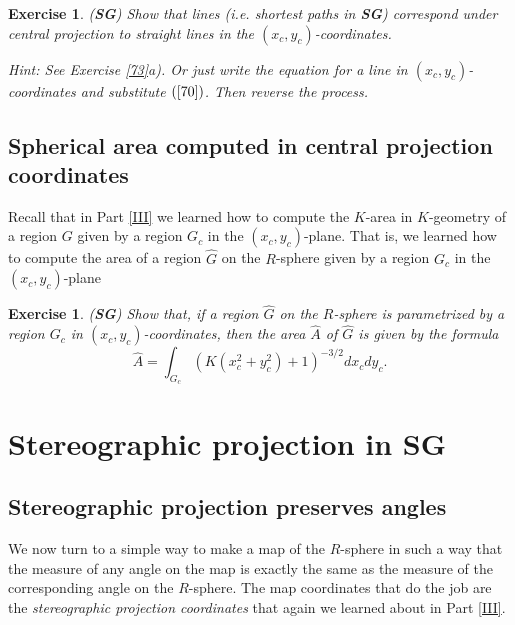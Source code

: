 \documentclass{article}%
\newtheorem{exercise}[theorem]{Exercise}
\begin{document}
\begin{exercise}
(\textbf{SG}) Show that lines (i.e. shortest paths in \textbf{SG}) correspond
under central projection to straight lines in the $\left(  x_{c},y_{c}\right)
$-coordinates.

Hint: See Exercise \ref{73}a). Or just write the equation for a line in
$\left(  x_{c},y_{c}\right)  $-coordinates and substitute $\left(
\ref{70}\right)  $. Then reverse the process.\pagebreak
\end{exercise}

\subsection{Spherical area computed in central projection coordinates}

Recall that in Part \ref{III} we learned how to compute the $K$-area in
$K$-geometry of a region $G$ given by a region $G_{c}$ in the $\left(
x_{c},y_{c}\right)  $-plane. That is, we learned how to compute the area of a
region $\hat{G}$ on the $R$-sphere given by a region $G_{c}$ in the $\left(
x_{c},y_{c}\right)  $-plane

\begin{exercise}
(\textbf{SG}) Show that, if a region $\hat{G}$ on the $R$-sphere is
parametrized by a region $G_{c}$ in $\left(  x_{c},y_{c}\right)
$-coordinates, then the area $\hat{A}$ of $\hat{G}$ is given by the formula%
\[
\hat{A}=%
{\displaystyle\int\nolimits_{G_{c}}}
\left(  K\left(  x_{c}^{2}+y_{c}^{2}\right)  +1\right)  ^{-3/2}dx_{c}dy_{c}.
\]

\end{exercise}

\pagebreak

\section{Stereographic projection in \textbf{SG}}

\subsection{Stereographic projection preserves angles}

We now turn to a simple way to make a map of the $R$-sphere in such a way that
the measure of any angle on the map is exactly the same as the measure of the
corresponding angle on the $R$-sphere. The map coordinates that do the job are
the \textit{stereographic projection coordinates} that again we learned about
in Part \ref{III}.
\end{document}
